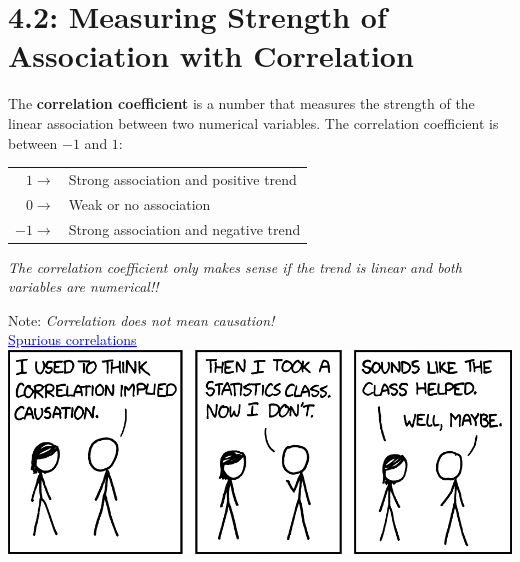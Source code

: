\documentclass[../mathNotesPreamble]{subfiles}
\begin{document}
  \section{4.2: Measuring Strength of Association with Correlation}
    \begin{defn*}
      The \textbf{correlation coefficient} is a number that measures the strength of the linear association between two numerical variables. The correlation coefficient is between $-1$ and $1$:
      \begin{center}
        \begin{tabular}{@{}rl@{}}\toprule
          $1 \rightarrow$ & Strong association and positive trend\\
          $0 \rightarrow$ & Weak or no association\\
          $-1 \rightarrow$ & Strong association and negative trend\\\bottomrule
        \end{tabular}
      \end{center}
      \emph{The correlation coefficient only makes sense if the trend is linear and both variables are numerical!!}
    \end{defn*}

    \begin{center}
      Note: \emph{Correlation does not mean causation!}\\[\baselineskip]
      
      \href{https://www.tylervigen.com/spurious-correlations}{\textcolor{blue}{\underline{Spurious correlations}}}\\[\baselineskip]
      
      \href{https://xkcd.com/552}{\includegraphics[width=0.85\linewidth]{images/correlation_2x_xkcd_552}}
    \end{center}
    \pagebreak
    
\end{document}
